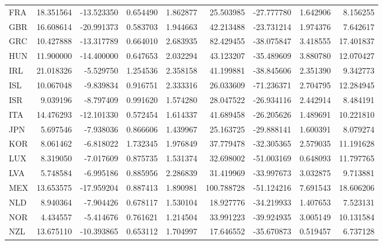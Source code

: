 \documentclass[../main.tex]{subfiles}
\begin{document}
\begin{table}[H]
{\begin{tabular}{lrrrrrrrr}
FRA      &      18.351564 & -13.523350 &  0.654490 &  1.862877 &             25.503985 & -27.777780 &  1.642906 &   8.156255 \\
GBR      &      16.608614 & -20.991373 &  0.583703 &  1.944663 &             42.213488 & -23.731214 &  1.974376 &   7.642617 \\
GRC      &      10.427888 & -13.317789 &  0.664010 &  2.683935 &             82.429455 & -38.075847 &  3.418555 &  17.401837 \\
HUN      &      11.900000 & -14.400000 &  0.647653 &  2.032294 &             43.123207 & -35.489609 &  3.880780 &  12.070427 \\
IRL      &      21.018326 &  -5.529750 &  1.254536 &  2.358158 &             41.199881 & -38.845606 &  2.351390 &   9.342773 \\
ISL      &      10.067048 &  -9.839834 &  0.916751 &  2.333316 &             26.033609 & -71.236371 &  2.704795 &  12.284945 \\
ISR      &       9.039196 &  -8.797409 &  0.991620 &  1.574280 &             28.047522 & -26.934116 &  2.442914 &   8.484191 \\
ITA      &      14.476293 & -12.101330 &  0.572454 &  1.614337 &             41.689458 & -26.205626 &  1.489691 &  10.221810 \\
JPN      &       5.697546 &  -7.938036 &  0.866606 &  1.439967 &             25.163725 & -29.888141 &  1.600391 &   8.079274 \\
KOR      &       8.061462 &  -6.818022 &  1.732345 &  1.976849 &             37.779478 & -32.305365 &  2.579035 &  11.191628 \\
LUX      &       8.319050 &  -7.017609 &  0.875735 &  1.531374 &             32.698002 & -51.003169 &  0.648093 &  11.797765 \\
LVA      &       5.748584 &  -6.995186 &  0.885956 &  2.286839 &             31.419969 & -33.997673 &  3.032875 &   9.713881 \\
MEX      &      13.653575 & -17.959204 &  0.887413 &  1.890981 &            100.788728 & -51.124216 &  7.691543 &  18.606206 \\
NLD      &       8.940364 &  -7.904426 &  0.678117 &  1.530104 &             18.927776 & -34.219933 &  1.407653 &   7.523131 \\
NOR      &       4.434557 &  -5.414676 &  0.761621 &  1.214504 &             33.991223 & -39.924935 &  3.005149 &  10.131584 \\
NZL      &      13.675110 & -10.393865 &  0.653112 &  1.704997 &             17.646552 & -35.670873 &  0.519457 &   6.737128 \\

\end{tabular}}
\end{table}
\end{document}
